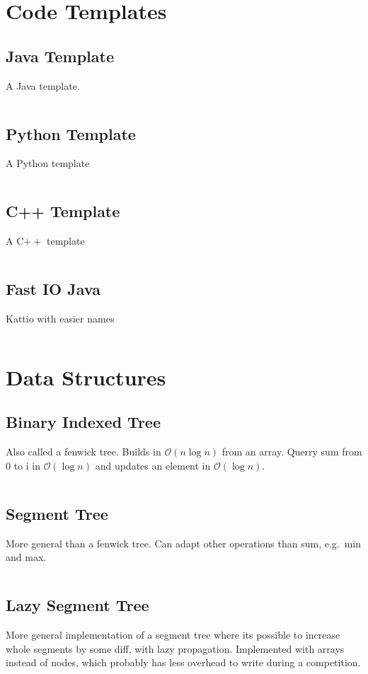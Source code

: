 \documentclass[8pt,a4paper,landscape,oneside]{amsart}
\newcommand{\code}[1]{\inputminted[fontsize=\normalsize,baselinestretch=1]{cpp}{code/#1}}
\newcommand{\bigO}{\mathcal{O}}
\begin{document}
\begin{multicols*}{3}
\thispagestyle{fancy}
\vspace{-3em}

\tableofcontents
\section{Code Templates}
    \subsection{Java Template}
        A Java template.
        \code{template.java}
    \subsection{Python Template}
        A Python template
        \code{template.py}
    \subsection{C++ Template}
        A C$++$ template
        \code{template.cpp}
    \subsection{Fast IO Java}
        Kattio with easier names
        \code{fastio.java}

\section{Data Structures}
    \subsection{Binary Indexed Tree}
        Also called a fenwick tree. Builds in $\bigO(n \log{n})$ from an array. Querry sum from 0 to i in $\bigO(\log{n})$ and updates an element in $\bigO(\log{n})$.
        \code{DS/BIT.java}
    \subsection{Segment Tree}
        More general than a fenwick tree. Can adapt other operations than sum, e.g.\ min and max.
        \code{DS/ST.java}
    \subsection{Lazy Segment Tree}
        More general implementation of a segment tree where its possible to increase whole segments by some diff, with lazy propagation. Implemented with arrays instead of nodes, which probably has less overhead to write during a competition.
        \code{DS/LazySegmentTree.java}

\end{multicols*}
\end{document}
